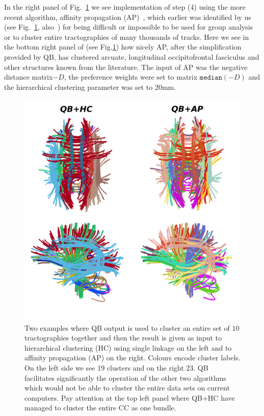 \documentclass[preprint,authoryear,a4paper,10pt,onecolumn]{elsarticle}
\begin{document}
In the right panel of Fig.~\ref{Flo:LSC+HC+AP} we see implementation of
step (4) using the more recent algorithm, affinity propagation
(AP)~\citep{dueck2009affinity}, which earlier was identified by us (see
Fig.~\ref{Flo:LSC+HC+AP}, also~\citep{malcolm2009filtered}) for being
difficult or impossible to be used for group analysis or to cluster
entire tractographies of many thousands of tracks.
Here we see in the bottom right panel of (see Fig.\ref{Flo:LSC+HC+AP})
how nicely AP, after the simplification provided by QB, has clustered
arcuate, longitudinal occipitofrontal fasciculus and other structures
known from the literature. The input of AP was the negative distance
matrix$-D$, the preference weights were set to matrix $\mathtt{median}(-D)$
and the hierarchical clustering parameter was set to $20$mm.

\begin{figure}
\begin{centering}
\includegraphics[scale=0.7]{last_figures/LSC_with_others}
\par\end{centering}
\caption{Two examples where QB output is used to cluster an entire set
  of $10$ tractographies together and then the result is given as input
  to hierarchical clustering (HC) using single linkage on the left and
  to affinity propagation (AP) on the right. Colours encode cluster
  labels. On the left side we see 19 clusters and on the right
  23. QB facilitates significantly the operation of the other two
  algorithms which would not be able to cluster the entire data sets on
  current computers. Pay attention at the top left panel where QB+HC
  have managed to cluster the entire CC as one bundle.\label{Flo:LSC+HC+AP}}
\end{figure}
\end{document}
